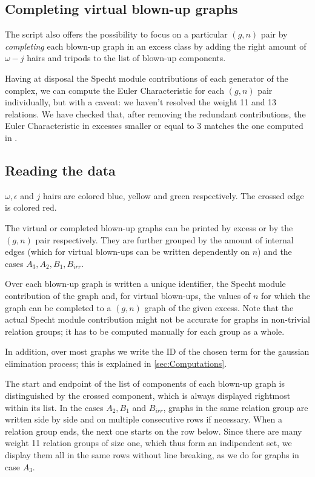 \subsection{Completing virtual blown-up graphs} The script also offers the possibility to focus on a particular $(g,n)$ pair by \textit{completing} each blown-up graph in an excess class by adding the right amount of $\omega-j$ hairs and tripods to the list of blown-up components.

Having at disposal the Specht module contributions of each generator of the complex, we can compute the Euler Characteristic for each $(g,n)$ pair individually, but with a caveat: we haven't resolved the weight 11 and 13 relations. We have checked that, after removing the redundant contributions, the Euler Characteristic in excesses smaller or equal to 3 matches the one computed in \cite[Figure 1]{CLPW}.

\subsection{Reading the data} $\omega,\epsilon$ and $j$ hairs are colored blue, yellow and green respectively. The crossed edge is colored red.

The virtual or completed blown-up graphs can be printed by excess or by the $(g,n)$ pair respectively. They are further grouped by the amount of internal edges (which for virtual blown-ups can be written dependently on $n$) and the cases $A_3,A_2,B_1,B_{irr}$.

Over each blown-up graph is written a unique identifier, the Specht module contribution of the graph and, for virtual blown-ups, the values of $n$ for which the graph can be completed to a $(g,n)$ graph of the given excess. Note that the actual Specht module contribution might not be accurate for graphs in non-trivial relation groups; it has to be computed manually for each group as a whole. 

In addition, over most graphs we write the ID of the chosen term for the gaussian elimination process; this is explained in \ref{sec:Computations}.

The start and endpoint of the list of components of each blown-up graph is distinguished by the crossed component, which is always displayed rightmost within its list. In the cases $A_2, B_1$ and $B_{irr}$, graphs in the same relation group are written side by side and on multiple consecutive rows if necessary. When a relation group ends, the next one starts on the row below. Since there are many weight 11 relation groups of size one, which thus form an indipendent set, we display them all in the same rows without line breaking, as we do for graphs in case $A_3$.